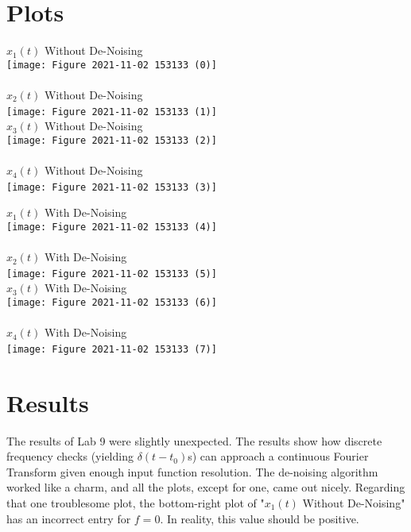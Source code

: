 \documentclass[12pt]{report}
\begin{document}
\section{Plots}
\begin{center}
    $x_{1}(t)$ Without De-Noising\\
    \texttt{[image: Figure 2021-11-02 153133 (0)]}\\~\\
    $x_{2}(t)$ Without De-Noising\\
    \texttt{[image: Figure 2021-11-02 153133 (1)]}
    \pagebreak~\\
    $x_{3}(t)$ Without De-Noising\\
    \texttt{[image: Figure 2021-11-02 153133 (2)]}\\~\\
    $x_{4}(t)$ Without De-Noising\\
    \texttt{[image: Figure 2021-11-02 153133 (3)]}
    \pagebreak~\\
\end{center}
\begin{center}
    $x_{1}(t)$ With De-Noising\\
    \texttt{[image: Figure 2021-11-02 153133 (4)]}\\~\\
    $x_{2}(t)$ With De-Noising\\
    \texttt{[image: Figure 2021-11-02 153133 (5)]}
    \pagebreak~\\
    $x_{3}(t)$ With De-Noising\\
    \texttt{[image: Figure 2021-11-02 153133 (6)]}\\~\\
    $x_{4}(t)$ With De-Noising\\
    \texttt{[image: Figure 2021-11-02 153133 (7)]}
    \pagebreak~\\
\end{center}

\section{Results}
The results of Lab 9 were slightly unexpected. The results show how discrete frequency checks (yielding $\delta (t - t_0)$s) can approach a continuous Fourier Transform given enough input function resolution. The de-noising algorithm worked like a charm, and all the plots, except for one, came out nicely. Regarding that one troublesome plot, the bottom-right plot of "$x_{1}(t)$ Without De-Noising" has an incorrect entry for $f = 0$. In reality, this value should be positive.
\end{document}
